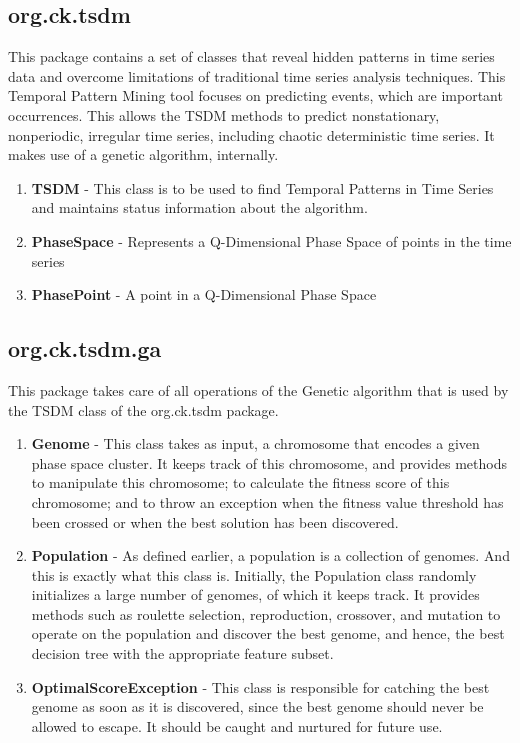 \documentclass[12pt]{report}
\begin{document}
\subsection{org.ck.tsdm}

This package contains a set of classes that reveal hidden
patterns in time series data and overcome limitations of traditional time series analysis
techniques. This Temporal Pattern Mining tool focuses on predicting events, which are important
occurrences. This allows the TSDM methods to predict nonstationary, nonperiodic,
irregular time series, including chaotic deterministic time series. It makes use of a genetic algorithm, internally.

\begin{enumerate}

\item{\textbf{TSDM} - This class is to be used to find Temporal Patterns in Time Series and maintains status information about the algorithm.}

\item{\textbf{PhaseSpace} - Represents a Q-Dimensional Phase Space of points in the time series}

\item{\textbf{PhasePoint} - A point in a Q-Dimensional Phase Space}

\end{enumerate}

\subsection{org.ck.tsdm.ga}
This package takes care of all operations of the Genetic algorithm that is used by the TSDM class of the org.ck.tsdm package.

\begin{enumerate}
\item{\textbf{Genome} - This class takes as input, a chromosome that encodes a given phase space cluster. It keeps track of this chromosome, and provides methods to manipulate
this chromosome; to calculate the fitness score of this chromosome; and to throw an
exception when the fitness value threshold has been crossed or when the best solution has been discovered.}


\item{\textbf{Population} - As defined earlier, a population is a collection of genomes. And this is
exactly what this class is. Initially, the Population class randomly initializes a large
number of genomes, of which it keeps track. It provides methods such as roulette
selection, reproduction, crossover, and mutation to operate on the population and
discover the best genome, and hence, the best decision tree with the appropriate
feature subset.}


\item{\textbf{OptimalScoreException} - This class is responsible for catching the best genome
as soon as it is discovered, since the best genome should never be allowed to escape.
It should be caught and nurtured for future use.}

\end{enumerate}
\end{document}
